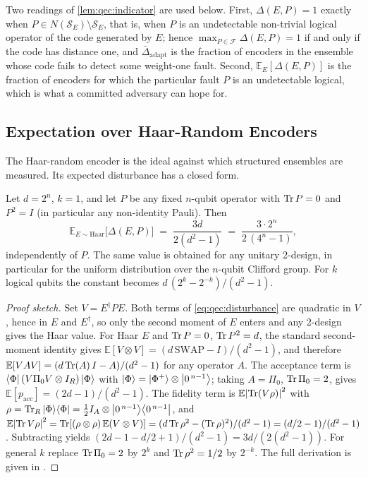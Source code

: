 Two readings of \cref{lem:qec:indicator} are used below. First, $\Delta(E,P)=1$ exactly when $P\in N(\mathcal{S}_E)\setminus\mathcal{S}_E$, that is, when $P$ is an undetectable non-trivial logical operator of the code generated by $E$; hence $\max_{P\in\mathcal{F}}\Delta(E,P)=1$ if and only if the code has distance one, and $\bar\Delta_{\mathrm{adapt}}$ is the fraction of encoders in the ensemble whose code fails to detect some weight-one fault. Second, $\mathbb{E}_E[\Delta(E,P)]$ is the fraction of encoders for which the particular fault $P$ is an undetectable logical, which is what a committed adversary can hope for.

\subsection{Expectation over Haar-Random Encoders}\label{sec:qec:haar}

The Haar-random encoder is the ideal against which structured ensembles are measured. Its expected disturbance has a closed form.

\begin{proposition}\label{prop:qec:haar}
Let $d=2^{n}$, $k=1$, and let $P$ be any fixed $n$-qubit operator with $\Tr P=0$ and $P^{2}=I$ (in particular any non-identity Pauli). Then
\begin{equation}\label{eq:qec:haar}
  \mathbb{E}_{E\sim\mathrm{Haar}}\big[\Delta(E,P)\big]\;=\;\frac{3d}{2(d^{2}-1)}\;=\;\frac{3\cdot 2^{n}}{2\,(4^{n}-1)},
\end{equation}
independently of $P$. The same value is obtained for any unitary 2-design, in particular for the uniform distribution over the $n$-qubit Clifford group. For $k$ logical qubits the constant becomes $d\,(2^{k}-2^{-k})/(d^{2}-1)$.
\end{proposition}
\begin{proof}[Proof sketch]
Set $V=E^{\dagger}PE$. Both terms of \cref{eq:qec:disturbance} are quadratic in $V$, hence in $E$ and $E^{\dagger}$, so only the second moment of $E$ enters and any 2-design gives the Haar value. For Haar $E$ and $\Tr P=0$, $\Tr P^{2}=d$, the standard second-moment identity gives $\mathbb{E}[V\otimes V]=(d\,\mathrm{SWAP}-I)/(d^{2}-1)$, and therefore $\mathbb{E}[VAV]=(d\Tr(A)\,I-A)/(d^{2}-1)$ for any operator $A$. The acceptance term is $\bra{\Phi}(V\Pi_0V\otimes I_R)\ket{\Phi}$ with $\ket{\Phi}=\ket{\Phi^{+}}\otimes\ket{0^{\,n-1}}$; taking $A=\Pi_0$, $\Tr\Pi_0=2$, gives $\mathbb{E}[p_{\mathrm{acc}}]=(2d-1)/(d^{2}-1)$. The fidelity term is $\mathbb{E}\abs{\Tr(V\rho)}^{2}$ with $\rho=\Tr_R\ket{\Phi}\!\bra{\Phi}=\tfrac12 I_A\otimes\ket{0^{\,n-1}}\!\bra{0^{\,n-1}}$, and $\mathbb{E}\abs{\Tr V\rho}^{2}=\Tr[(\rho\otimes\rho)\,\mathbb{E}(V\otimes V)]=(d\Tr\rho^{2}-(\Tr\rho)^{2})/(d^{2}-1)=(d/2-1)/(d^{2}-1)$. Subtracting yields $(2d-1-d/2+1)/(d^{2}-1)=3d/(2(d^{2}-1))$. For general $k$ replace $\Tr\Pi_0=2$ by $2^{k}$ and $\Tr\rho^{2}=1/2$ by $2^{-k}$. The full derivation is given in \cite{guo2026qecaudit}.
\end{proof}

